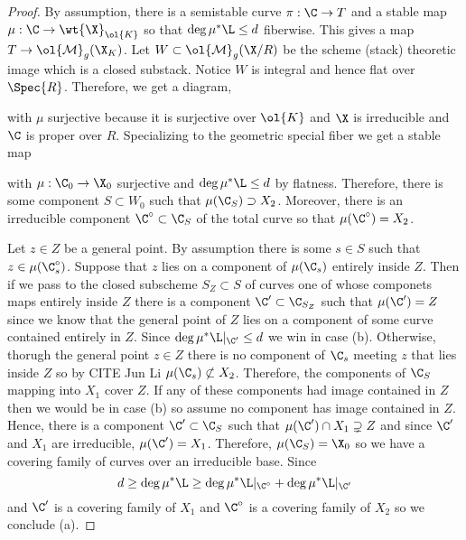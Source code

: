\documentclass[12pt]{article}
\begin{document}
\newcommand{\Mbar}{\ol{\mathcal{M}}}
\newcommand{\cU}{\mathcal{U}}
\newcommand{\cN}{\mathcal{N}}

\begin{proof}
By assumption, there is a semistable curve $\pi : \C \to T$ and a stable map $\mu : \C \to \wt{\X}_{\ol{K}}$ so that $\deg{\mu^* \L} \le d$ fiberwise. This gives a map $T \to \Mbar_{g}(\X_K)$. Let $W \subset \Mbar_{g}(\X / R)$ be the scheme (stack) theoretic image which is a closed substack. Notice $W$ is integral and hence flat over $\Spec{R}$. Therefore, we get a diagram,
\begin{center}
\end{center}
with $\mu$ surjective because it is surjective over $\ol{K}$ and $\X$ is irreducible and $\C$ is proper over $R$.
Specializing to the geometric special fiber we get a stable map
\begin{center}
\end{center}
with $\mu : \C_0 \to \X_0$ surjective and $\deg{\mu^* \L} \le d$ by flatness. Therefore, there is some component $S \subset W_0$ such that $\mu(\C_S) \supset X_2$. Moreover, there is an irreducible component $\C^\circ \subset \C_S$ of the total curve so that $\mu(\C^\circ) = X_2$. 

Let $z \in Z$ be a general point. By assumption there is some $s \in S$ such that $z \in \mu(\C_s^\circ)$. Suppose that $z$ lies on a component of $\mu(\C_s)$ entirely inside $Z$. Then if we pass to the closed subscheme $S_Z \subset S$ of curves one of whose componets maps entirely inside $Z$ there is a component $\C' \subset \C_{S_Z}$ such that $\mu(\C') = Z$ since we know that the general point of $Z$ lies on a component of some curve contained entirely in $Z$. Since $\deg{\mu^* \L|_{\C'}} \le d$ we win in case (b). Otherwise, thorugh the general point $z \in Z$ there is no component of $\C_s$ meeting $z$ that lies inside $Z$ so by {\color{red} CITE Jun Li} $\mu(\C_s) \not \subset X_2$. Therefore, the components of $\C_S$ mapping into $X_1$ cover $Z$. If any of these components had image contained in $Z$ then we would be in case (b) so assume no component has image contained in $Z$. Hence, there is a component $\C' \subset \C_S$ such that $\mu(\C') \cap X_1 \supsetneq Z$ and since $\C'$ and $X_1$ are irreducible, $\mu(\C') = X_1$. Therefore, $\mu(\C_S) = \X_0$ so we have a covering family of curves over an irreducible base. Since  \[ d \ge \deg{\mu^* \L} \ge \deg{\mu^* \L|_{\C^\circ}} + \deg{\mu^* \L|_{\C'}} \]
and $\C'$ is a covering family of $X_1$ and $\C^\circ$ is a covering family of $X_2$ so we conclude (a).
\end{proof}
\end{document}
